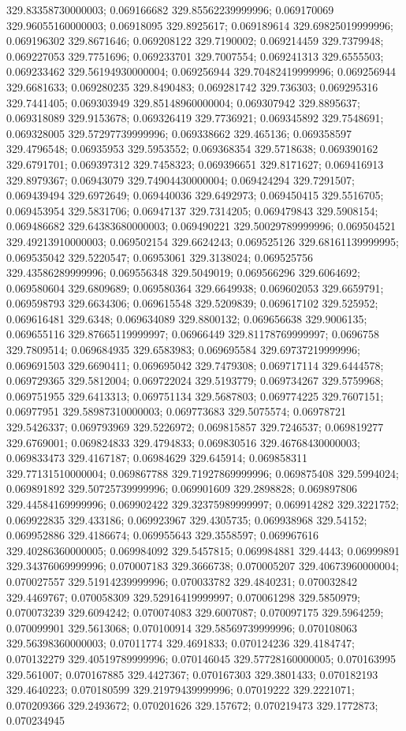 329.83358730000003; 0.069166682 329.85562239999996; 0.069170069 329.96055160000003; 0.06918095 329.8925617; 0.069189614 329.69825019999996; 0.069196302 329.8671646; 0.069208122 329.7190002; 0.069214459 329.7379948; 0.069227053 329.7751696; 0.069233701 329.7007554; 0.069241313 329.6555503; 0.069233462 329.56194930000004; 0.069256944 329.70482419999996; 0.069256944 329.6681633; 0.069280235 329.8490483; 0.069281742 329.736303; 0.069295316 329.7441405; 0.069303949 329.85148960000004; 0.069307942 329.8895637; 0.069318089 329.9153678; 0.069326419 329.7736921; 0.069345892 329.7548691; 0.069328005 329.57297739999996; 0.069338662 329.465136; 0.069358597 329.4796548; 0.06935953 329.5953552; 0.069368354 329.5718638; 0.069390162 329.6791701; 0.069397312 329.7458323; 0.069396651 329.8171627; 0.069416913 329.8979367; 0.06943079 329.74904430000004; 0.069424294 329.7291507; 0.069439494 329.6972649; 0.069440036 329.6492973; 0.069450415 329.5516705; 0.069453954 329.5831706; 0.06947137 329.7314205; 0.069479843 329.5908154; 0.069486682 329.64383680000003; 0.069490221 329.50029789999996; 0.069504521 329.49213910000003; 0.069502154 329.6624243; 0.069525126 329.68161139999995; 0.069535042 329.5220547; 0.06953061 329.3138024; 0.069525756 329.43586289999996; 0.069556348 329.5049019; 0.069566296 329.6064692; 0.069580604 329.6809689; 0.069580364 329.6649938; 0.069602053 329.6659791; 0.069598793 329.6634306; 0.069615548 329.5209839; 0.069617102 329.525952; 0.069616481 329.6348; 0.069634089 329.8800132; 0.069656638 329.9006135; 0.069655116 329.87665119999997; 0.06966449 329.81178769999997; 0.0696758 329.7809514; 0.069684935 329.6583983; 0.069695584 329.69737219999996; 0.069691503 329.6690411; 0.069695042 329.7479308; 0.069717114 329.6444578; 0.069729365 329.5812004; 0.069722024 329.5193779; 0.069734267 329.5759968; 0.069751955 329.6413313; 0.069751134 329.5687803; 0.069774225 329.7607151; 0.06977951 329.58987310000003; 0.069773683 329.5075574; 0.06978721 329.5426337; 0.069793969 329.5226972; 0.069815857 329.7246537; 0.069819277 329.6769001; 0.069824833 329.4794833; 0.069830516 329.46768430000003; 0.069833473 329.4167187; 0.06984629 329.645914; 0.069858311 329.77131510000004; 0.069867788 329.71927869999996; 0.069875408 329.5994024; 0.069891892 329.50725739999996; 0.069901609 329.2898828; 0.069897806 329.44584169999996; 0.069902422 329.32375989999997; 0.069914282 329.3221752; 0.069922835 329.433186; 0.069923967 329.4305735; 0.069938968 329.54152; 0.069952886 329.4186674; 0.069955643 329.3558597; 0.069967616 329.40286360000005; 0.069984092 329.5457815; 0.069984881 329.4443; 0.06999891 329.34376069999996; 0.070007183 329.3666738; 0.070005207 329.40673960000004; 0.070027557 329.51914239999996; 0.070033782 329.4840231; 0.070032842 329.4469767; 0.070058309 329.52916419999997; 0.070061298 329.5850979; 0.070073239 329.6094242; 0.070074083 329.6007087; 0.070097175 329.5964259; 0.070099901 329.5613068; 0.070100914 329.58569739999996; 0.070108063 329.56398360000003; 0.07011774 329.4691833; 0.070124236 329.4184747; 0.070132279 329.40519789999996; 0.070146045 329.57728160000005; 0.070163995 329.561007; 0.070167885 329.4427367; 0.070167303 329.3801433; 0.070182193 329.4640223; 0.070180599 329.21979439999996; 0.07019222 329.2221071; 0.070209366 329.2493672; 0.070201626 329.157672; 0.070219473 329.1772873; 0.070234945 